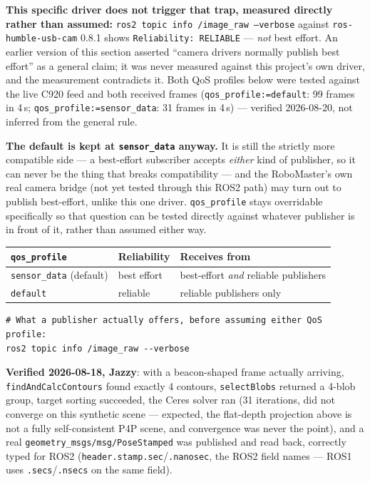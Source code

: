 \documentclass[11pt]{report}
\begin{document}
\textbf{This specific driver does not trigger that trap, measured directly
rather than assumed:} \texttt{ros2 topic info /image\_raw --verbose} against
\texttt{ros-humble-usb-cam} 0.8.1 shows \texttt{Reliability: RELIABLE} ---
\emph{not} best effort. An earlier version of this section asserted ``camera
drivers normally publish best effort'' as a general claim; it was never
measured against this project's own driver, and the measurement contradicts
it. Both QoS profiles below were tested against the live C920 feed and both
received frames (\texttt{qos\_profile:=default}: 99 frames in 4\,s;
\texttt{qos\_profile:=sensor\_data}: 31 frames in 4\,s) --- verified
2026-08-20, not inferred from the general rule.

\textbf{The default is kept at \texttt{sensor\_data} anyway.} It is still
the strictly more compatible side --- a best-effort subscriber accepts
\emph{either} kind of publisher, so it can never be the thing that breaks
compatibility --- and the RoboMaster's own real camera bridge (not yet
tested through this ROS2 path) may turn out to publish best-effort, unlike
this one driver. \texttt{qos\_profile} stays overridable specifically so
that question can be tested directly against whatever publisher is in front
of it, rather than assumed either way.

\begin{center}
\begin{tabular}{@{}lll@{}}
\toprule
\textbf{\texttt{qos\_profile}} & \textbf{Reliability} & \textbf{Receives from} \\
\midrule
\texttt{sensor\_data} (default) & best effort & best-effort \emph{and} reliable publishers \\
\texttt{default}                & reliable    & reliable publishers only \\
\bottomrule
\end{tabular}
\end{center}

\begin{lstlisting}[style=shell]
# What a publisher actually offers, before assuming either QoS profile:
ros2 topic info /image_raw --verbose
\end{lstlisting}

\textbf{Verified 2026-08-18, Jazzy}: with a beacon-shaped frame actually
arriving, \texttt{findAndCalcContours} found exactly 4 contours,
\texttt{selectBlobs} returned a 4-blob group, target sorting succeeded, the
Ceres solver ran (31 iterations, did not converge on this synthetic scene ---
expected, the flat-depth projection above is not a fully self-consistent P4P
scene, and convergence was never the point), and a real
\texttt{geometry\_msgs/msg/PoseStamped} was published and read back,
correctly typed for ROS2 (\texttt{header.stamp.sec}/\texttt{.nanosec}, the
ROS2 field names --- ROS1 uses \texttt{.secs}/\texttt{.nsecs} on the same
field).
\end{document}
